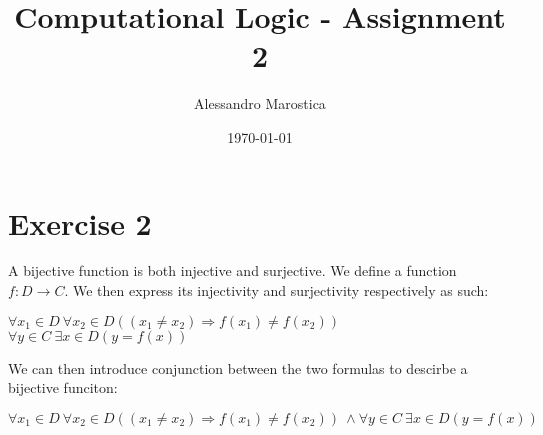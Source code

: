 \documentclass[11pt]{exam}
\title{Computational Logic - Assignment 2}
\author{Alessandro Marostica}
\date{\today}
\begin{document}
\maketitle
\section*{Exercise 2}
A bijective function is both injective and surjective.
We define a function \(f: D \rightarrow C\). We then express its injectivity and surjectivity respectively as such:
\\
\begin{center}
    \(\forall x_1 \in D \  \forall x_2 \in D((x_1 \neq x_2) \Longrightarrow f(x_1) \neq f(x_2)) \)
    \\
    \(\forall y \in C \  \exists x \in D(y = f(x))\)
\end{center}
We can then introduce conjunction between the two formulas to descirbe a bijective funciton:
\begin{center}
    \(\forall x_1 \in D \  \forall x_2 \in D((x_1 \neq x_2) \Longrightarrow f(x_1) \neq f(x_2))\ \wedge \forall y \in C \  \exists x \in D(y = f(x))\)
\end{center}
\end{document}
